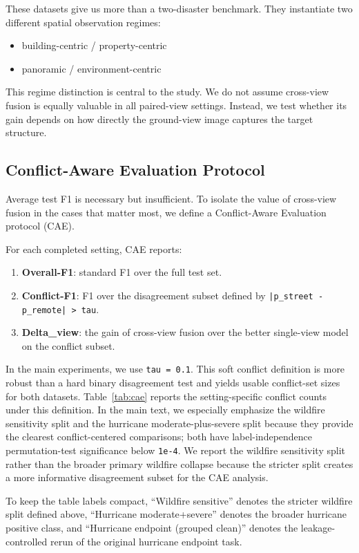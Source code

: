 \documentclass[sigconf]{acmart}
\begin{document}
These datasets give us more than a two-disaster benchmark. They instantiate two
different spatial observation regimes:
\begin{itemize}
  \item building-centric / property-centric
  \item panoramic / environment-centric
\end{itemize}

This regime distinction is central to the study. We do not assume cross-view
fusion is equally valuable in all paired-view settings. Instead, we test
whether its gain depends on how directly the ground-view image captures the
target structure.

\subsection{Conflict-Aware Evaluation Protocol}

Average test F1 is necessary but insufficient. To isolate the value of
cross-view fusion in the cases that matter most, we define a Conflict-Aware
Evaluation protocol (CAE).

For each completed setting, CAE reports:
\begin{enumerate}
  \item \textbf{Overall-F1}: standard F1 over the full test set.
  \item \textbf{Conflict-F1}: F1 over the disagreement subset defined by
  \texttt{|p\_street - p\_remote| > tau}.
  \item \textbf{Delta\_view}: the gain of cross-view fusion over the better
  single-view model on the conflict subset.
\end{enumerate}

In the main experiments, we use \texttt{tau = 0.1}. This soft conflict
definition is more robust than a hard binary disagreement test and yields
usable conflict-set sizes for both datasets. Table~\ref{tab:cae} reports the
setting-specific conflict counts under this definition. In the main text, we
especially emphasize the wildfire sensitivity split and the hurricane
moderate-plus-severe split because they provide the clearest conflict-centered
comparisons; both have label-independence permutation-test significance below
\texttt{1e-4}. We report the wildfire sensitivity split rather than the
broader primary wildfire collapse because the stricter split creates a more
informative disagreement subset for the CAE analysis.

To keep the table labels compact, ``Wildfire sensitive'' denotes the stricter
wildfire split defined above, ``Hurricane moderate+severe'' denotes the broader
hurricane positive class, and ``Hurricane endpoint (grouped clean)'' denotes the
leakage-controlled rerun of the original hurricane endpoint task.
\end{document}
